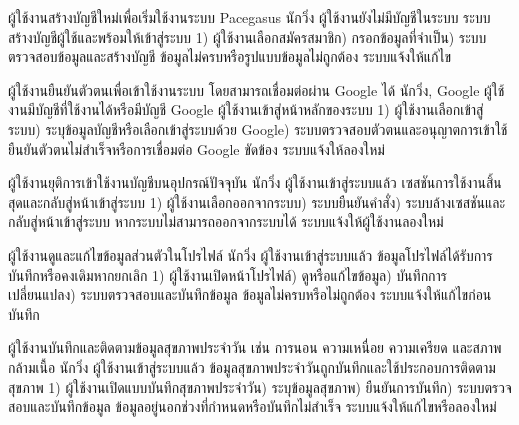
{ผู้ใช้งานสร้างบัญชีใหม่เพื่อเริ่มใช้งานระบบ Pacegasus}
{นักวิ่ง}
{ผู้ใช้งานยังไม่มีบัญชีในระบบ}
{ระบบสร้างบัญชีผู้ใช้และพร้อมให้เข้าสู่ระบบ}
{1) ผู้ใช้งานเลือกสมัครสมาชิก) กรอกข้อมูลที่จำเป็น) ระบบตรวจสอบข้อมูลและสร้างบัญชี}
{ข้อมูลไม่ครบหรือรูปแบบข้อมูลไม่ถูกต้อง ระบบแจ้งให้แก้ไข}

{ผู้ใช้งานยืนยันตัวตนเพื่อเข้าใช้งานระบบ โดยสามารถเชื่อมต่อผ่าน Google ได้}
{นักวิ่ง, Google}
{ผู้ใช้งานมีบัญชีที่ใช้งานได้หรือมีบัญชี Google}
{ผู้ใช้งานเข้าสู่หน้าหลักของระบบ}
{1) ผู้ใช้งานเลือกเข้าสู่ระบบ) ระบุข้อมูลบัญชีหรือเลือกเข้าสู่ระบบด้วย Google) ระบบตรวจสอบตัวตนและอนุญาตการเข้าใช้}
{ยืนยันตัวตนไม่สำเร็จหรือการเชื่อมต่อ Google ขัดข้อง ระบบแจ้งให้ลองใหม่}

{ผู้ใช้งานยุติการเข้าใช้งานบัญชีบนอุปกรณ์ปัจจุบัน}
{นักวิ่ง}
{ผู้ใช้งานเข้าสู่ระบบแล้ว}
{เซสชันการใช้งานสิ้นสุดและกลับสู่หน้าเข้าสู่ระบบ}
{1) ผู้ใช้งานเลือกออกจากระบบ) ระบบยืนยันคำสั่ง) ระบบล้างเซสชันและกลับสู่หน้าเข้าสู่ระบบ}
{หากระบบไม่สามารถออกจากระบบได้ ระบบแจ้งให้ผู้ใช้งานลองใหม่}

{ผู้ใช้งานดูและแก้ไขข้อมูลส่วนตัวในโปรไฟล์}
{นักวิ่ง}
{ผู้ใช้งานเข้าสู่ระบบแล้ว}
{ข้อมูลโปรไฟล์ได้รับการบันทึกหรือคงเดิมหากยกเลิก}
{1) ผู้ใช้งานเปิดหน้าโปรไฟล์) ดูหรือแก้ไขข้อมูล) บันทึกการเปลี่ยนแปลง) ระบบตรวจสอบและบันทึกข้อมูล}
{ข้อมูลไม่ครบหรือไม่ถูกต้อง ระบบแจ้งให้แก้ไขก่อนบันทึก}

{ผู้ใช้งานบันทึกและติดตามข้อมูลสุขภาพประจำวัน เช่น การนอน ความเหนื่อย ความเครียด และสภาพกล้ามเนื้อ}
{นักวิ่ง}
{ผู้ใช้งานเข้าสู่ระบบแล้ว}
{ข้อมูลสุขภาพประจำวันถูกบันทึกและใช้ประกอบการติดตามสุขภาพ}
{1) ผู้ใช้งานเปิดแบบบันทึกสุขภาพประจำวัน) ระบุข้อมูลสุขภาพ) ยืนยันการบันทึก) ระบบตรวจสอบและบันทึกข้อมูล}
{ข้อมูลอยู่นอกช่วงที่กำหนดหรือบันทึกไม่สำเร็จ ระบบแจ้งให้แก้ไขหรือลองใหม่}

